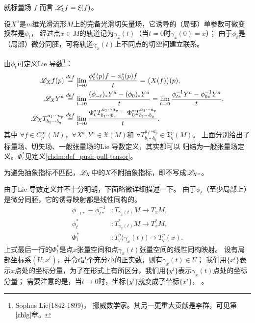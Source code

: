 \begin{example}
    就标量场 $f$ 而言 $\mathscr{L}_\xi f=\xi(f)$。
\end{example}


设$X^a$是$m$维光滑流形$M$上的完备光滑切矢量场，它诱导的（局部）单参数可微变换群是$\phi_t$，
经过点$x\in M$的轨道记为$\gamma_x(t)$（当$t=0$时$\gamma_x(0)=x$）；
由于$\phi_t$是（局部）微分同胚，可将轨道$\gamma_x(t)$上不同点的切空间建立联系。
\begin{definition}
    由$\phi_t$可定义Lie 导数\footnote{Sophus Lie(1842-1899)，
            挪威数学家。其另一更重大贡献是李群，可见第\ref{chlg}章。}：
    \begin{align}
        \mathscr{L}_{X} f(p) &\overset{def}{=} \lim_{t\to 0}
        \frac{\phi^{*}_{t}(p) f-\phi^{*}_{0}(p)f}{t} = \bigl(X(f)\bigr)(p), \label{chdm:def_LieD-scalar} \\
        \mathscr{L}_{X} Y^{a} &\overset{def}{=} \lim_{t\to 0}
        \frac{(\phi_{-t})_{*} Y^{a}-(\phi_{0})_{*}Y^{a}}{t}=\lim_{t\to 0}
        \frac{\phi^{-1}_{t*} Y^{a}-\phi^{-1}_{0*}Y^{a}}{t},  \label{chdm:def_LieD-vector} \\
        \mathscr{L}_{X} T_{b_1\cdots b_q}^{a_1\cdots a_p} &\overset{def}{=} \lim_{t\to 0}
        \frac{\Phi^{*}_{t} T_{b_1\cdots b_q}^{a_1\cdots a_p}-\Phi^{*}_{0}T_{b_1\cdots b_q}^{a_1\cdots a_p}}{t} .
          \label{chdm:def_LieD-tensor}
    \end{align}
    其中 $\forall f \in C^\infty_p(M)$，$\forall X^a, Y^{a} \in \mathfrak{X}(M) $和
    $\forall T_{b_1\cdots b_q}^{a_1\cdots a_p} \in \mathfrak{T}^p_q(M)$。
    上面分别给出了标量场、切矢场、一般张量场的Lie 导数定义，其实都可以
    归结为一般张量场定义。$\Phi^{*}_{t}$见定义\ref{chdm:def_push-pull-tensor}。
\end{definition}

\begin{remark}\label{chdm:rek_lieabstnoa}
    为避免抽象指标不匹配，$\mathscr{L}_{X}$中的$X$不附抽象指标，即不写成$\mathscr{L}_{X^a}$。
\end{remark}


由于Lie 导数定义并不十分明朗，下面略微详细描述一下。
由于$\phi_t$（至少局部上）是微分同胚，它的诱导映射都是线性同构的。
\begin{align}
    \phi_{-t*} \equiv \phi_{t*} ^{-1} &: T_{\gamma_x(t)}M \to T_x M , \\
    \phi_{t}^{*} &: T_{\gamma_x(t)}^{*}M \to T_x^{*} M , \\
    \Phi_{t}^{*} &: T_q^p\bigl({\gamma_x(t)}\bigr) \to T_q^p(x) .
\end{align}
上式最后一行的$\Phi_t^{*}$是点$x$张量空间和点$\gamma_x(t)$张量空间的线性同构映射。
设有局部坐标系$(U;x^i)$，并令$t$是个充分小的正实数，则有$\gamma_x(t)\in U$；
我们用$\{x^i\}$表示$x$点处的坐标分量，为了在形式上有所区分，我们用$\{y^i\}$表示$\gamma_x(t)$点处的坐标分量；
需要注意的是，当$t\to 0$时，坐标$\{y^i\}$就变成了坐标$\{x^i\}$，
。


